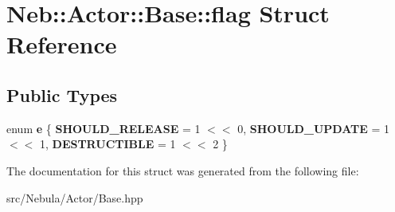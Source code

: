 \hypertarget{structNeb_1_1Actor_1_1Base_1_1flag}{\section{\-Neb\-:\-:\-Actor\-:\-:\-Base\-:\-:flag \-Struct \-Reference}
\label{structNeb_1_1Actor_1_1Base_1_1flag}
}
\subsection*{\-Public \-Types}
\begin{DoxyCompactItemize}
\item 
enum {\bfseries e} \{ {\bfseries \-S\-H\-O\-U\-L\-D\-\_\-\-R\-E\-L\-E\-A\-S\-E} =  1 $<$$<$ 0, 
{\bfseries \-S\-H\-O\-U\-L\-D\-\_\-\-U\-P\-D\-A\-T\-E} =  1 $<$$<$ 1, 
{\bfseries \-D\-E\-S\-T\-R\-U\-C\-T\-I\-B\-L\-E} =  1 $<$$<$ 2
 \}
\end{DoxyCompactItemize}


\-The documentation for this struct was generated from the following file\-:\begin{DoxyCompactItemize}
\item 
src/\-Nebula/\-Actor/\-Base.\-hpp\end{DoxyCompactItemize}
